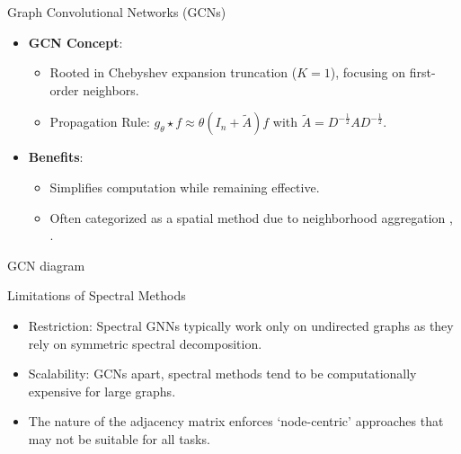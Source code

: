 \begin{frame}{Graph Convolutional Networks (GCNs)}
    \begin{itemize}
        \item \textbf{GCN Concept}:
        \begin{itemize}
            \item Rooted in Chebyshev expansion truncation ($K=1$), focusing on first-order neighbors.
            \item Propagation Rule: $g_{\theta} \star f \approx \theta (I_n + \widetilde{A}) f$ with $\widetilde{A} = D^{-\frac{1}{2}} A D^{-\frac{1}{2}}$.
        \end{itemize}
        \item \textbf{Benefits}:
        \begin{itemize}
            \item Simplifies computation while remaining effective.
            \item Often categorized as a spatial method due to neighborhood aggregation \cite{kipf2016semi}, \cite{wu2019simplifying}.
        \end{itemize}
    \end{itemize}
\end{frame}

\begin{frame}{GCN diagram}
    
\end{frame}

\begin{frame}{Limitations of Spectral Methods}
    \begin{itemize}
        \item Restriction: Spectral GNNs typically work only on undirected graphs as they rely on symmetric spectral decomposition.

        \item Scalability: GCNs apart, spectral methods tend to be computationally expensive for large graphs.

        \item The nature of the adjacency matrix enforces `node-centric' approaches that may not be suitable for all tasks.

    \end{itemize}
\end{frame}
